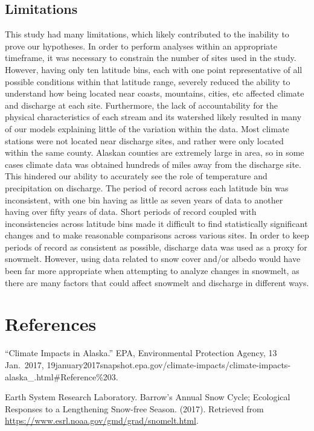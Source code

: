 \documentclass[12pt,]{article}
\begin{document}
\hypertarget{limitations}{%
\subsection{Limitations}\label{limitations}}

This study had many limitations, which likely contributed to the
inability to prove our hypotheses. In order to perform analyses within
an appropriate timeframe, it was necessary to constrain the number of
sites used in the study. However, having only ten latitude bins, each
with one point representative of all possible conditions within that
latitude range, severely reduced the ability to understand how being
located near coasts, mountains, cities, etc affected climate and
discharge at each site. Furthermore, the lack of accountability for the
physical characteristics of each stream and its watershed likely
resulted in many of our models explaining little of the variation within
the data. Most climate stations were not located near discharge sites,
and rather were only located within the same county. Alaskan counties
are extremely large in area, so in some cases climate data was obtained
hundreds of miles away from the discharge site. This hindered our
ability to accurately see the role of temperature and precipitation on
discharge. The period of record across each latitude bin was
inconsistent, with one bin having as little as seven years of data to
another having over fifty years of data. Short periods of record coupled
with inconsistencies across latitude bins made it difficult to find
statistically significant changes and to make reasonable comparisons
across various sites. In order to keep periods of record as consistent
as possible, discharge data was used as a proxy for snowmelt. However,
using data related to snow cover and/or albedo would have been far more
appropriate when attempting to analyze changes in snowmelt, as there are
many factors that could affect snowmelt and discharge in different ways.

\newpage

\hypertarget{references}{%
\section{References}\label{references}}

``Climate Impacts in Alaska.'' EPA, Environmental Protection Agency, 13
Jan.~2017,
19january2017snapshot.epa.gov/climate-impacts/climate-impacts-alaska\_.html\#Reference\%203.

Earth System Research Laboratory. Barrow's Annual Snow Cycle; Ecological
Responses to a Lengthening Snow-free Season. (2017). Retrieved from
\url{https://www.esrl.noaa.gov/gmd/grad/snomelt.html}.
\end{document}
